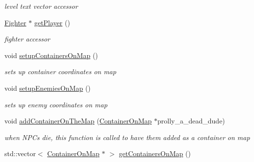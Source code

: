 \begin{DoxyCompactItemize}
\begin{DoxyCompactList}\small\item\em level text vector accessor \end{DoxyCompactList}\item 
\hypertarget{class_pre_built_level_ab00f1496cbd95f85dd9471539a7525a9}{}\label{class_pre_built_level_ab00f1496cbd95f85dd9471539a7525a9} 
\hyperlink{class_fighter}{Fighter} $\ast$ \hyperlink{class_pre_built_level_ab00f1496cbd95f85dd9471539a7525a9}{get\+Player} ()
\begin{DoxyCompactList}\small\item\em fighter accessor \end{DoxyCompactList}\item 
\hypertarget{class_pre_built_level_ae49e0ab74872be75e2546610607d5868}{}\label{class_pre_built_level_ae49e0ab74872be75e2546610607d5868} 
void \hyperlink{class_pre_built_level_ae49e0ab74872be75e2546610607d5868}{setup\+Containers\+On\+Map} ()
\begin{DoxyCompactList}\small\item\em sets up container coordinates on map \end{DoxyCompactList}\item 
\hypertarget{class_pre_built_level_a53bd1cda4f32c5da41e1c21295ef4861}{}\label{class_pre_built_level_a53bd1cda4f32c5da41e1c21295ef4861} 
void \hyperlink{class_pre_built_level_a53bd1cda4f32c5da41e1c21295ef4861}{setup\+Enemies\+On\+Map} ()
\begin{DoxyCompactList}\small\item\em sets up enemy coordinates on map \end{DoxyCompactList}\item 
\hypertarget{class_pre_built_level_a32c66e3eb960c12deb55024688ab76a3}{}\label{class_pre_built_level_a32c66e3eb960c12deb55024688ab76a3} 
void \hyperlink{class_pre_built_level_a32c66e3eb960c12deb55024688ab76a3}{add\+Container\+On\+The\+Map} (\hyperlink{struct_container_on_map}{Container\+On\+Map} $\ast$prolly\+\_\+a\+\_\+dead\+\_\+dude)
\begin{DoxyCompactList}\small\item\em when N\+P\+Cs die, this function is called to have them added as a container on map \end{DoxyCompactList}\item 
\hypertarget{class_pre_built_level_a0089fb9d42b5ee32e395b7b7c4fd3576}{}\label{class_pre_built_level_a0089fb9d42b5ee32e395b7b7c4fd3576} 
std\+::vector$<$ \hyperlink{struct_container_on_map}{Container\+On\+Map} $\ast$ $>$ \hyperlink{class_pre_built_level_a0089fb9d42b5ee32e395b7b7c4fd3576}{get\+Containers\+On\+Map} ()

\end{DoxyCompactItemize}
